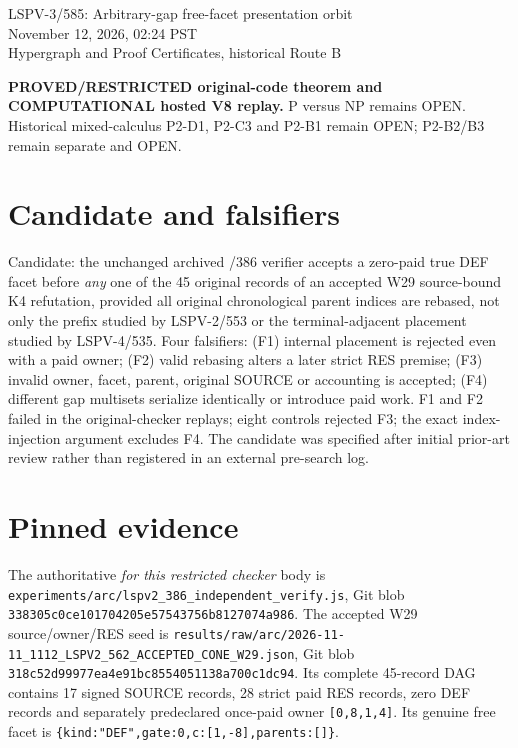 \documentclass[11pt]{article}
\begin{document}
\begin{center}
{\Large LSPV-3/585: Arbitrary-gap free-facet presentation orbit}\\[4pt]
November 12, 2026, 02:24 PST\\
Hypergraph and Proof Certificates, historical Route B
\end{center}
\noindent\textbf{PROVED/RESTRICTED original-code theorem and COMPUTATIONAL hosted V8 replay.}
P versus NP remains OPEN. Historical mixed-calculus P2-D1, P2-C3 and P2-B1 remain OPEN; P2-B2/B3 remain separate and OPEN.

\section*{Candidate and falsifiers}
Candidate: the unchanged archived /386 verifier accepts a zero-paid true DEF facet before \emph{any} one of the 45 original records of an accepted W29 source-bound K4 refutation, provided all original chronological parent indices are rebased, not only the prefix studied by LSPV-2/553 or the terminal-adjacent placement studied by LSPV-4/535.
Four falsifiers: (F1) internal placement is rejected even with a paid owner; (F2) valid rebasing alters a later strict RES premise; (F3) invalid owner, facet, parent, original SOURCE or accounting is accepted; (F4) different gap multisets serialize identically or introduce paid work. F1 and F2 failed in the original-checker replays; eight controls rejected F3; the exact index-injection argument excludes F4. The candidate was specified after initial prior-art review rather than registered in an external pre-search log.

\section*{Pinned evidence}
The authoritative \emph{for this restricted checker} body is \texttt{experiments/arc/lspv2\_386\_independent\_verify.js}, Git blob \texttt{338305c0ce101704205e57543756b8127074a986}. The accepted W29 source/owner/RES seed is \texttt{results/raw/arc/2026-11-11\_1112\_LSPV2\_562\_ACCEPTED\_CONE\_W29.json}, Git blob \texttt{318c52d99977ea4e91bc8554051138a700c1dc94}. Its complete 45-record DAG contains 17 signed SOURCE records, 28 strict paid RES records, zero DEF records and separately predeclared once-paid owner \texttt{[0,8,1,4]}. Its genuine free facet is \texttt{\{kind:"DEF",gate:0,c:[1,-8],parents:[]\}}.
\end{document}
